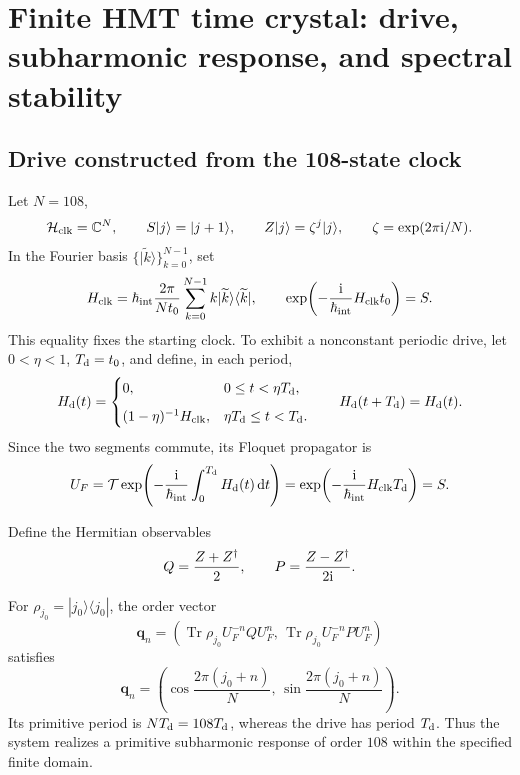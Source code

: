 \section{Finite HMT time crystal: drive, subharmonic response, and spectral stability}
\label{sec:hmtf2-cristal-temporal}

\subsection{Drive constructed from the 108-state clock}

Let \(N=108\),
\[
 \mathcal H_{\rm clk}=\mathbb C^N,\qquad
 S|j\rangle=|j+1\rangle,\qquad
 Z|j\rangle=\zeta^j|j\rangle,\qquad
 \zeta=\exp(2\pi{\rm i}/N).
\]
In the Fourier basis \(\{|\widetilde k\rangle\}_{k=0}^{N-1}\), set
\[
 H_{\rm clk}
 =\hbar_{\rm int}\frac{2\pi}{Nt_0}
 \sum_{k=0}^{N-1}k|\widetilde k\rangle\langle\widetilde k|,
 \qquad
 \exp\!\left(-\frac{{\rm i}}{\hbar_{\rm int}}H_{\rm clk}t_0\right)=S.
\]
This equality fixes the starting clock. To exhibit a nonconstant
periodic drive, let \(0<\eta<1\), \(T_{\rm d}=t_0\), and
define, in each period,
\[
 H_{\rm d}(t)=
 \begin{cases}
  0,&0\leq t<\eta T_{\rm d},\\[2mm]
  (1-\eta)^{-1}H_{\rm clk},
  &\eta T_{\rm d}\leq t<T_{\rm d}.
 \end{cases}
 \qquad H_{\rm d}(t+T_{\rm d})=H_{\rm d}(t).
\]
Since the two segments commute, its Floquet propagator is
\[
 U_F
 =\mathcal T\exp\!\left(
 -\frac{{\rm i}}{\hbar_{\rm int}}\int_0^{T_{\rm d}}H_{\rm d}(t)\,\mathrm dt
 \right)
 =\exp\!\left(-\frac{{\rm i}}{\hbar_{\rm int}}H_{\rm clk}T_{\rm d}\right)
 =S.
\]

Define the Hermitian observables
\[
 Q=\frac{Z+Z^\dagger}{2},
 \qquad
 P=\frac{Z-Z^\dagger}{2{\rm i}}.
\]

\begin{theorem}
\label{thm:hmtf2-subarmonia-108}
For \(\rho_{j_0}=|j_0\rangle\langle j_0|\), the order vector
\[
 \mathbf q_n
 =\left(
 \operatorname{Tr}\rho_{j_0}U_F^{-n}QU_F^n,\,
 \operatorname{Tr}\rho_{j_0}U_F^{-n}PU_F^n
 \right)
\]
satisfies
\[
 \mathbf q_n
 =\left(
 \cos\frac{2\pi(j_0+n)}N,\,
 \sin\frac{2\pi(j_0+n)}N
 \right).
\]
Its primitive period is \(N T_{\rm d}=108T_{\rm d}\), whereas the drive
has period \(T_{\rm d}\). Thus the system realizes a
primitive subharmonic response of order \(108\) within the specified finite domain.
\end{theorem}

